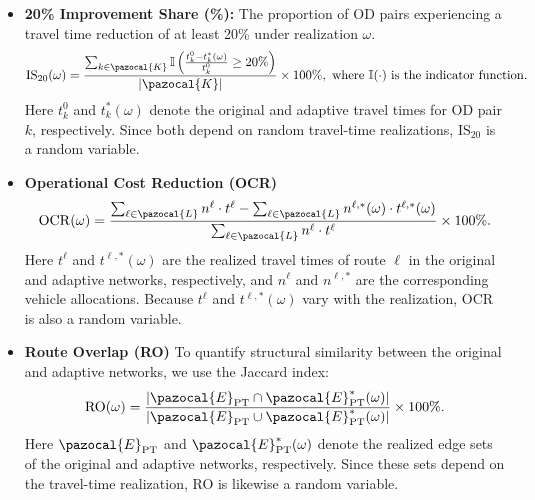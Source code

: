 \documentclass[a4paper,fleqn]{cas-sc}
\begin{document}
\begin{itemize}
    \item \textbf{20\% Improvement Share (\%):} The proportion of OD pairs experiencing a travel time reduction of at least 20\% under realization $\omega$.
    \begin{align}
        \text{IS$_{20}$}(\omega) = \frac{\sum_{k \in \pazocal{K}} \mathbb{I} \left( \frac{t_k^0 - t_k^*(\omega)}{t_k^0} \geq 20\% \right)}{|\pazocal{K}|} \times 100\%, \text{ where } \mathbb{I}(\cdot) \text{ is the indicator function.}\nonumber
    \end{align}
    Here $t_k^0$ and $t_k^*(\omega)$ denote the original and adaptive travel times for OD pair $k$, respectively. Since both depend on random travel-time realizations, $\text{IS$_{20}$}$ is a random variable.

    \item \textbf{Operational Cost Reduction (OCR)}
        \[
            \mathrm{OCR}(\omega)
            =
            \frac{\sum_{\ell \in \pazocal{L}} n^\ell \cdot t^\ell
                  -
                  \sum_{\ell \in \pazocal{L}} n^{\ell,*}(\omega) \cdot t^{\ell,*}(\omega)}
                 {\sum_{\ell \in \pazocal{L}} n^\ell \cdot t^\ell}
            \times 100\%.
        \]
    Here $t^\ell$ and $t^{\ell,*}(\omega)$ are the realized travel times of route $\ell$ in the original and adaptive networks, respectively,
    and $n^\ell$ and $n^{\ell,*}$ are the corresponding vehicle allocations.
    Because $t^\ell$ and $t^{\ell,*}(\omega)$ vary with the realization, OCR is also a random variable.

    \item \textbf{Route Overlap (RO)}
    To quantify structural similarity between the original and adaptive networks, we use the Jaccard index:
    \[
        \mathrm{RO}(\omega)
        =
        \frac{\lvert \pazocal{E}_{\mathrm{PT}}
                 \cap
                 \pazocal{E}_{\mathrm{PT}}^*(\omega)\rvert}
             {\lvert \pazocal{E}_{\mathrm{PT}}
                 \cup
                 \pazocal{E}_{\mathrm{PT}}^*(\omega)\rvert}
        \times 100\%.
    \]
    Here $\pazocal{E}_{\mathrm{PT}}$ and $\pazocal{E}_{\mathrm{PT}}^*(\omega)$ denote the realized edge sets of the original and adaptive networks, respectively.
    Since these sets depend on the travel-time realization, RO is likewise a random variable.

\end{itemize}


\end{document}
